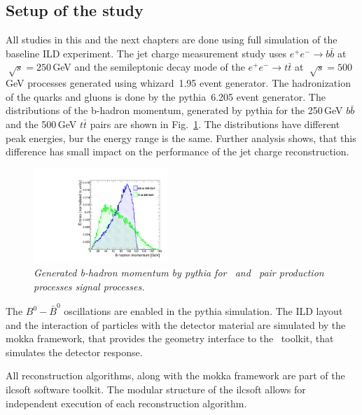 \subsection{Setup of the study}

All studies in this and the next chapters are done using full simulation of the baseline ILD experiment. 
The jet charge measurement study uses $e^+e^- \to b\bar{b}$ at $\sqrt[]{s} = 250$\,GeV and the semileptonic decay mode of the $e^+e^- \to t\bar{t}$ at $\sqrt[]{s} = 500$\,GeV processes generated using {\sc whizard}~1.95 event generator. 
The hadronization of the quarks and gluons is done by the {\sc pythia}~6.205 event generator.
The distributions of the b-hadron momentum, generated by {\sc pythia} for the 250\,GeV $b\bar{b}$ and the 500\,GeV $t\bar{t}$ pairs are shown in Fig.~\ref{fig:GenHadronMomentum_3}. 
The distributions have different peak energies, bur the energy range is the same. Further analysis shows, that this difference has small impact on the performance of the jet charge reconstruction.
\begin{figure}[h]
	{\centering
		\includegraphics[width=0.45\textwidth]{ILD/plots/gen-hadron-momentum.pdf}
		\caption{\sl Generated b-hadron momentum by {\sc pythia} for \bbbar\ and \ttbar\ pair production processes signal processes.}
		\label{fig:GenHadronMomentum_3}
	}
\end{figure}

The $B^0-\bar{B}^0$ oscillations are enabled in the {\sc pythia} simulation. 
The ILD layout and the interaction of particles with the detector material are simulated by the {\sc mokka} framework, that provides the geometry interface to the \geant\ toolkit, that simulates the detector response. 

All reconstruction algorithms, along with the {\sc mokka} framework are part of the {\sc ilcsoft} software toolkit.
The modular structure of the {\sc ilcsoft} allows for independent execution of each reconstruction algorithm. 


